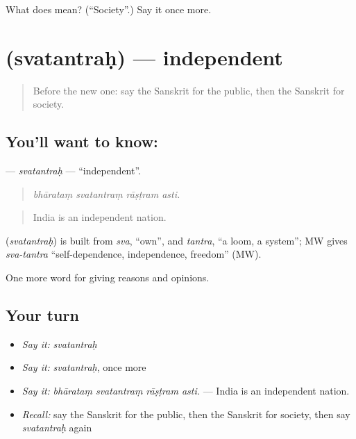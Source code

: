 \begin{tcolorbox}[breakable,colback=teal!4,colframe=teal!35!black,title={Before you move on}]
What does  mean? (\textquotedblleft{}Society\textquotedblright{}.) Say it once more.
\end{tcolorbox}
\section[\texorpdfstring{\sk{स्वतन्त्रः} (svatantraḥ)}{स्वतन्त्रः (svatantraḥ)}]{ (svatantraḥ) — independent}

\label{lesson:SA-C354-svatantrah}



\begin{quote}
Before the new one: say the Sanskrit for the public, then the Sanskrit for society.
\end{quote}

\subsection*{You'll want to know: }
\textbf{} — \emph{svatantraḥ} — \textquotedblleft{}independent\textquotedblright{}.

\begin{quote}
   
\end{quote}

\begin{quote}
\emph{bhārataṃ svatantraṃ rāṣṭram asti.}
\end{quote}

\begin{quote}
India is an independent nation.
\end{quote}

\begin{cousinweb}
\textbf{} (\emph{svatantraḥ}) is built from \emph{sva}, \textquotedblleft{}own\textquotedblright{}, and \emph{tantra}, \textquotedblleft{}a loom, a system\textquotedblright{}; MW gives \emph{sva-tantra} \textquotedblleft{}self-dependence, independence, freedom\textquotedblright{} (MW).
\end{cousinweb}

\begin{grammarlens}[title={What you've built}]
One more word for giving reasons and opinions.
\end{grammarlens}

\subsection*{Your turn}
\begin{itemize}
\raggedright
  \item \emph{Say it:} \emph{svatantraḥ}
  \item \emph{Say it:} \emph{svatantraḥ}, once more
  \item \emph{Say it:} \emph{bhārataṃ svatantraṃ rāṣṭram asti.} — India is an independent nation.
  \item \emph{Recall:} say the Sanskrit for the public, then the Sanskrit for society, then say \emph{svatantraḥ} again
\end{itemize}

